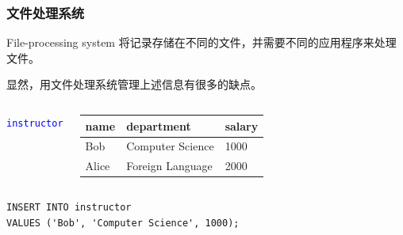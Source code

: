 \documentclass[aspectratio=169, 14pt]{beamer}
\begin{document}
\begin{frame}
	\frametitle{文件处理系统}

	\begin{block}{File-processing system}
		将记录存储在不同的文件，并需要不同的应用程序来处理文件。
	\end{block}
	显然，用文件处理系统管理上述信息有很多的缺点。
\end{frame}

\begin{frame}[fragile]

	\begin{columns}
		{\large \textcolor{blue}{\texttt{instructor}}}

		\begin{table}
			\begin{tabular}{lll}
				\toprule
				name  & department       & salary \\
				\midrule
				Bob   & Computer Science & 1000   \\
				Alice & Foreign Language & 2000   \\
				\bottomrule
			\end{tabular}
		\end{table}
	\end{columns}
	\begin{verbatim}
INSERT INTO instructor
VALUES ('Bob', 'Computer Science', 1000);
\end{verbatim}
\end{frame}
\end{document}
